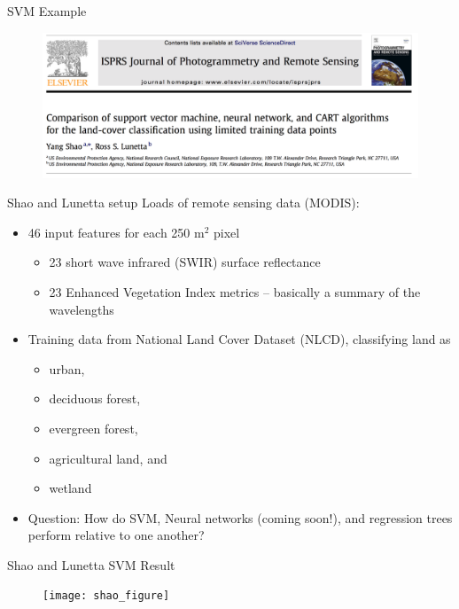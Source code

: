 \documentclass[mathserif, aspectratio=169]{beamer}
\begin{document}
\begin{frame}{SVM Example}

	\begin{figure}
		\includegraphics[width=\textwidth]{shao_JPRS}
		\caption*{}
	\end{figure}
\end{frame}


\begin{frame}{Shao and Lunetta setup}
	Loads of remote sensing data (MODIS):
	\begin{itemize}
		\item 46 input features for each 250 m$^2$ pixel
		      \begin{itemize}
			      \item 23 short wave infrared (SWIR) surface reflectance
			      \item 23 Enhanced Vegetation Index metrics -- basically a summary of the wavelengths
		      \end{itemize}
		\item Training data from National Land Cover Dataset (NLCD), classifying land as
		      \begin{itemize}
			      \item urban,
			      \item deciduous forest,
			      \item evergreen forest,
			      \item agricultural land, and
			      \item wetland
		      \end{itemize}

		\item Question: How do SVM, Neural networks (coming soon!), and regression trees perform relative to one another?
	\end{itemize}
\end{frame}


\begin{frame}{Shao and Lunetta SVM Result}

	\begin{figure}
		\texttt{[image: shao\_figure]}
		\caption*{}
	\end{figure}
\end{frame}
\end{document}
